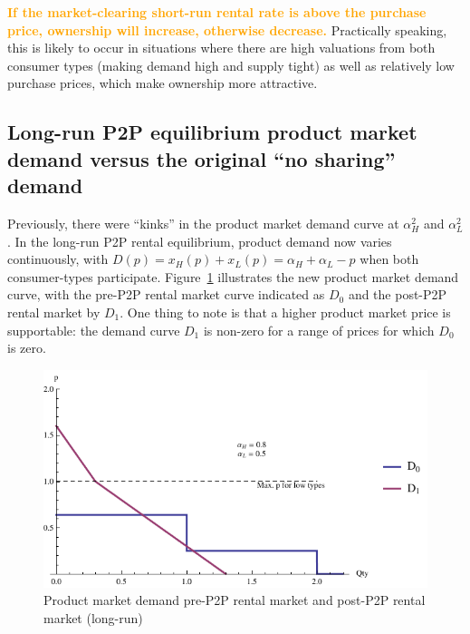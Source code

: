 \documentclass[11pt]{article}
\newcommand{\important}[1]{\textcolor{orange}{\textbf{#1}}}
\newcommand{\important}[1]{#1}
\begin{document}
\important{If the market-clearing short-run rental rate is above the purchase price, ownership will increase, otherwise decrease.}
Practically speaking, this is likely to occur in situations where there are high valuations from both consumer types (making demand high and supply tight) as well as relatively low purchase prices, which make ownership more attractive. 

\subsection{Long-run P2P equilibrium product market demand versus the original ``no sharing'' demand} 
Previously, there were ``kinks'' in the product market demand curve at $\alpha_H^2$ and $\alpha_L^2$. 
In the long-run P2P rental equilibrium, product demand now varies continuously, with $D(p) = x_H(p) + x_L(p) = \alpha_H + \alpha_L - p$ when both consumer-types participate. 
Figure~\ref{fig:demand} illustrates the new product market demand curve, with the pre-P2P rental market curve indicated as $D_0$ and the post-P2P rental market by $D_1$. 
One thing to note is that a higher product market price is supportable: the demand curve $D_1$ is non-zero for a range of prices for which $D_0$ is zero.  

\begin{figure}
\caption{Product market demand pre-P2P rental market and post-P2P rental market (long-run)}
\label{fig:demand} 
\centering
\includegraphics[scale = 1]{./diagrams/p2plr_demand.pdf}
\end{figure} 
\end{document}
